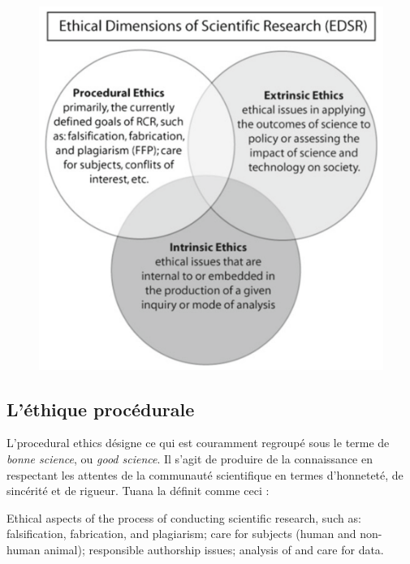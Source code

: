 \begin{figure}
    \centering

    \includegraphics[width=0.6\linewidth]{venn_ethics.png}
    \label{fig:diag-venn}
\end{figure}


\subsection{L'éthique procédurale}

L'\gls{procedural ethics} désigne ce qui est couramment regroupé sous le terme de \textit{bonne science}, ou \textit{good science}. Il s'agit de produire de la connaissance en respectant les attentes de la communauté scientifique en termes d'honneteté, de sincérité et de rigueur. Tuana   la définit comme ceci : 

\begin{authoredquote}
Ethical aspects of the process of conducting scientific research, such as: falsification, fabrication, and plagiarism; care for subjects (human and non-human animal); responsible authorship issues; analysis of and care for data.
\end{authoredquote}

